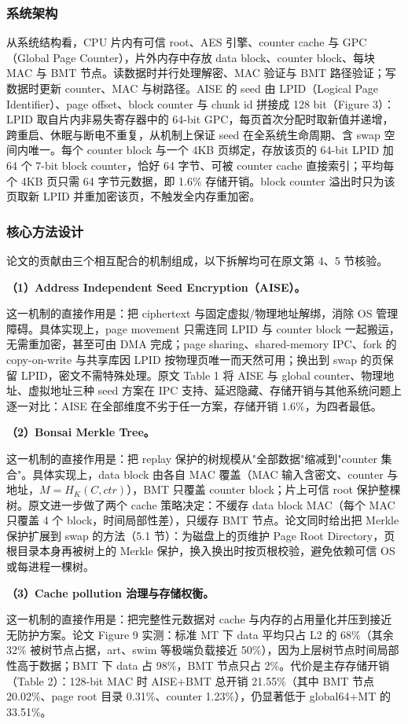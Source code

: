 \documentclass[11pt]{ctexart}
\begin{document}
\subsubsection{系统架构}
从系统结构看，CPU 片内有可信 root、AES 引擎、counter cache 与 GPC（Global Page Counter），片外内存中存放 data block、counter block、每块 MAC 与 BMT 节点。读数据时并行处理解密、MAC 验证与 BMT 路径验证；写数据时更新 counter、MAC 与树路径。AISE 的 seed 由 LPID（Logical Page Identifier）、page offset、block counter 与 chunk id 拼接成 128 bit（Figure 3）：LPID 取自片内非易失寄存器中的 64-bit GPC，每页首次分配时取新值并递增，跨重启、休眠与断电不重复，从机制上保证 seed 在全系统生命周期、含 swap 空间内唯一。每个 counter block 与一个 4KB 页绑定，存放该页的 64-bit LPID 加 64 个 7-bit block counter，恰好 64 字节、可被 counter cache 直接索引；平均每个 4KB 页只需 64 字节元数据，即 1.6\% 存储开销。block counter 溢出时只为该页取新 LPID 并重加密该页，不触发全内存重加密。\par
\subsubsection{核心方法设计}
论文的贡献由三个相互配合的机制组成，以下拆解均可在原文第 4、5 节核验。\par
\noindent\textbf{（1）Address Independent Seed Encryption（AISE）。}\par
这一机制的直接作用是：把 ciphertext 与固定虚拟/物理地址解绑，消除 OS 管理障碍。具体实现上，page movement 只需连同 LPID 与 counter block 一起搬运，无需重加密，甚至可由 DMA 完成；page sharing、shared-memory IPC、fork 的 copy-on-write 与共享库因 LPID 按物理页唯一而天然可用；换出到 swap 的页保留 LPID，密文不需特殊处理。原文 Table 1 将 AISE 与 global counter、物理地址、虚拟地址三种 seed 方案在 IPC 支持、延迟隐藏、存储开销与其他系统问题上逐一对比：AISE 在全部维度不劣于任一方案，存储开销 1.6\%，为四者最低。\par
\noindent\textbf{（2）Bonsai Merkle Tree。}\par
这一机制的直接作用是：把 replay 保护的树规模从"全部数据"缩减到"counter 集合"。具体实现上，data block 由各自 MAC 覆盖（MAC 输入含密文、counter 与地址，$M=H_K(C, ctr)$），BMT 只覆盖 counter block；片上可信 root 保护整棵树。原文进一步做了两个 cache 策略决定：不缓存 data block MAC（每个 MAC 只覆盖 4 个 block，时间局部性差），只缓存 BMT 节点。论文同时给出把 Merkle 保护扩展到 swap 的方法（5.1 节）：为磁盘上的页维护 Page Root Directory，页根目录本身再被树上的 Merkle 保护，换入换出时按页根校验，避免依赖可信 OS 或每进程一棵树。\par
\noindent\textbf{（3）Cache pollution 治理与存储权衡。}\par
这一机制的直接作用是：把完整性元数据对 cache 与内存的占用量化并压到接近无防护方案。论文 Figure 9 实测：标准 MT 下 data 平均只占 L2 的 68\%（其余 32\% 被树节点占据，art、swim 等极端负载接近 50\%），因为上层树节点时间局部性高于数据；BMT 下 data 占 98\%，BMT 节点只占 2\%。代价是主存存储开销（Table 2）：128-bit MAC 时 AISE+BMT 总开销 21.55\%（其中 BMT 节点 20.02\%、page root 目录 0.31\%、counter 1.23\%），仍显著低于 global64+MT 的 33.51\%。\par
\end{document}

